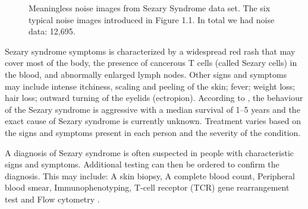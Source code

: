 \begin{figure}[ht]
\begin{center}
\begin{subfigure}[b]{0.25\textwidth}
			\label{fig:Good Cell}
		\end{subfigure}
	\end{center}
	\caption{Meaningless noise images from Sezary Syndrome data set.  The six typical  noise images introduced in Figure 1.1. In total we had noise data: 12,695.}
	\label{fig:lennas}
\end{figure}

Sezary syndrome symptoms is characterized by a widespread red rash that may cover most of the body, the presence of cancerous T cells (called Sezary cells) in the blood, and abnormally enlarged lymph nodes. Other signs and symptoms may include intense itchiness, scaling and peeling of the skin; fever; weight loss; hair loss; outward turning of the eyelids (ectropion). According to \cite{10.1182/blood-2004-09-3502}\cite{20001195667}, the behaviour of the Sezary syndrome is aggressive with a median survival of 1–5 years  and the exact cause of Sezary syndrome is currently unknown. Treatment varies based on the signs and symptoms present in each person and the severity of the condition.\cite{Yamashita}

A diagnosis of Sezary syndrome is often suspected in people with characteristic signs and symptoms. Additional testing can then be ordered to confirm the diagnosis. This may include: A skin biopsy, A complete blood count, Peripheral blood smear, Immunophenotyping, T-cell receptor (TCR) gene rearrangement test and Flow cytometry \cite{Alain}.


